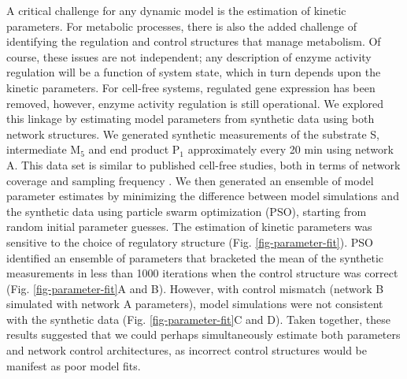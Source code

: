 \documentclass[processes,article,accept,moreauthors,pdftex,12pt,a4paper]{mdpi}
\begin{document}
A critical challenge for any dynamic model is the estimation of kinetic parameters. 
For metabolic processes, there is also the added challenge of identifying the regulation and control structures that manage metabolism. 
Of course, these issues are not independent; any description of enzyme activity regulation will be a function of system state, which in turn depends upon the kinetic parameters. 
For cell-free systems, regulated gene expression has been removed, however, enzyme activity regulation is still operational. 
We explored this linkage by estimating model parameters from synthetic data using both network structures. 
We generated synthetic measurements of the substrate S, intermediate M$_{5}$ and end product P$_1$ approximately every 20 min using
network A. This data set is similar to published cell-free studies, both in terms of network coverage and sampling frequency \citep{Jewett:2008aa}. 
We then generated an ensemble of model parameter estimates by minimizing the difference between model simulations and the synthetic data using particle swarm optimization (PSO), starting from random initial parameter guesses. The estimation of kinetic parameters was sensitive to the choice of regulatory structure (Fig. \ref{fig-parameter-fit}). 
PSO identified an ensemble of parameters that bracketed the mean of the synthetic measurements in less than 1000 iterations when the control structure was correct (Fig. \ref{fig-parameter-fit}A and B). 
However, with control mismatch (network B simulated with network A parameters), model simulations were not consistent with the synthetic data  (Fig. \ref{fig-parameter-fit}C and D). 
Taken together, these results suggested that we could perhaps simultaneously estimate both parameters and network control architectures, as incorrect control structures would be manifest as poor model fits.
\end{document}
